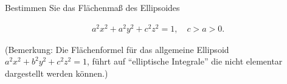 
\begin{exercise}

Bestimmen Sie das Flächenmaß des Ellipsoides

\begin{align*}
    a^2 x^2 + a^2 y^2 + c^2 z^2 = 1,
    \quad
    c > a > 0.
\end{align*}

(Bemerkung: Die Flächenformel für das allgemeine Ellipsoid $a^2 x^2 + b^2 y^2 + c^2 z^2 = 1$, führt auf \enquote{elliptische Integrale} die nicht elementar dargestellt werden können.)

\end{exercise}


